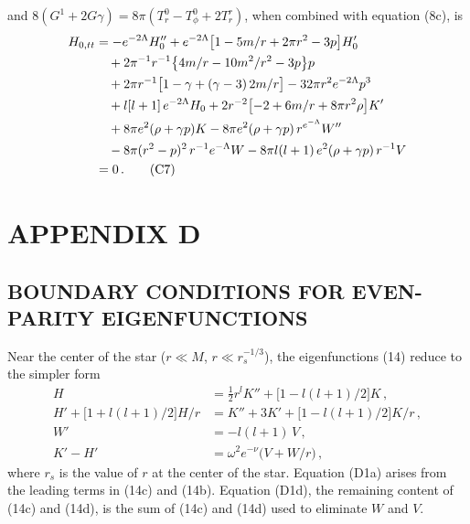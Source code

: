%

and $8(G^1 + 2G\gamma) = 8\pi(T_r^0 - T_\phi^0 + 2T_r^r)$, when combined with equation (8c), is
%
\begin{align}
H_{0,tt}
  &= -e^{-2\Lambda} H_0''
     + e^{-2\Lambda} \bigl[1 - 5m/r + 2\pi r^2 - 3p\bigr] H_0'   %
\notag \\
  &\quad
     + 2\pi^{-1} r^{-1} \bigl\{4m/r - 10m^2/r^2 - 3p\bigr\} p    %
\notag \\
  &\quad
     + 2\pi r^{-1} \bigl[1 - \gamma + (\gamma - 3)\,2m/r\bigr]
     - 32\pi r^2 e^{-2\Lambda} p^3                                  %
\notag \\
  &\quad
     + l[l+1]\,e^{-2\Lambda} H_0
     + 2r^{-2} \bigl[-2 + 6m/r + 8\pi r^2 \rho\bigr] K'
\notag \\
  &\quad
     + 8\pi e^2 (\rho + \gamma p) K
     - 8\pi e^2 (\rho + \gamma p)\,r^{e^{-\Lambda}} W''             %
\notag \\
  &\quad
     - 8\pi (r^2 - p)^2\,r^{-1} e^{-\Lambda} W
     - 8\pi l(l+1)\,e^2 (\rho + \gamma p)\,r^{-1} V                %
\notag \\
  &= 0 \,.
\tag{C7}
\end{align}


\section*{APPENDIX D}
\subsection*{BOUNDARY CONDITIONS FOR EVEN-PARITY EIGENFUNCTIONS}

Near the center of the star ($r \ll M$, $r \ll r_s^{-1/3}$), the eigenfunctions (14) reduce to the simpler
form
%
\begin{align}
H    &= \tfrac{1}{2} r^l K'' + \bigl[1 - l(l+1)/2\bigr] K \,, \tag{D1a} \\[4pt]
H' + \bigl[1 + l(l+1)/2\bigr] H/r
     &= K'' + 3K' + \bigl[1 - l(l+1)/2\bigr] K/r \,, \tag{D1b} \\[4pt]
W'   &= -l(l+1)\,V \,, \tag{D1c} \\[4pt]
K' - H' &= \omega^2 e^{-\nu} \bigl(V + W/r\bigr) \,, \tag{D1d}
\end{align}
%
where $r_s$ is the value of $r$ at the center of the star. Equation (D1a) arises from the leading terms
in (14c) and (14b). Equation (D1d), the remaining content of (14c) and (14d), is the sum of
(14c) and (14d) used to eliminate $W$ and $V$.

